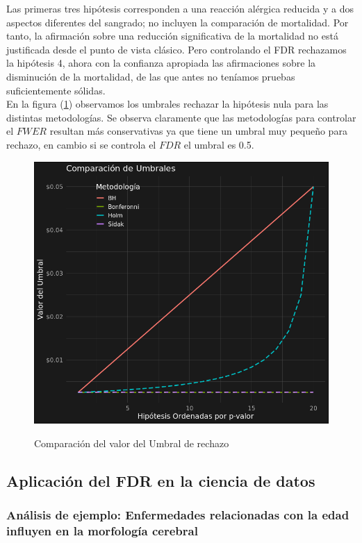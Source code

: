 \documentclass[11pt,letterpaper]{article}
\begin{document}
Las primeras tres hipótesis corresponden a una reacción alérgica reducida y a dos aspectos diferentes del sangrado; no incluyen la comparación de mortalidad. Por tanto, la afirmación sobre una reducción significativa de la mortalidad no está justificada desde el punto de vista clásico. Pero controlando el FDR rechazamos la hipótesis 4,  ahora con la confianza apropiada las afirmaciones sobre la disminución de la mortalidad, de las que antes no teníamos pruebas suficientemente sólidas.\\

En la figura  (\ref{comparacion_métodos}) observamos los umbrales rechazar la hipótesis nula  para las distintas metodologías. Se observa claramente que las metodologías para controlar el $FWER$ resultan más conservativas ya que tiene un umbral muy pequeño para rechazo, en cambio si se controla el $FDR$ el umbral es 0.5.

\begin{figure}[H]
\centering \label{comparacion_métodos}
\includegraphics[scale=.5]{comparacion_de_metodos.png}
\caption{Comparación del valor del Umbral de rechazo}
\end{figure}

\subsection*{Aplicación del FDR en la ciencia de datos}
\subsubsection*{Análisis de ejemplo: Enfermedades relacionadas con la edad influyen en la morfología cerebral}
\end{document}
